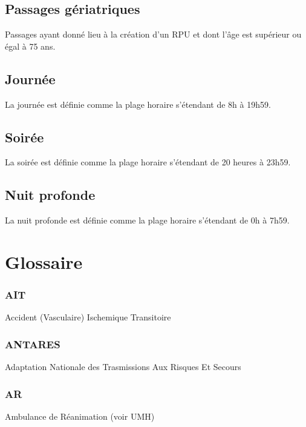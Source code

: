 \documentclass[12pt,english,french,twoside]{book}\usepackage[]{graphicx}\usepackage[]{color}
\begin{document}
\section*{Passages gériatriques}
Passages ayant donné lieu à la création d'un RPU et dont l'âge est supérieur ou égal à 75 ans.

\section*{Journée}
La journée est définie comme la plage horaire s'étendant de 8h à 19h59.

\section*{Soirée}
La soirée est définie comme la plage horaire s'étendant de 20 heures à 23h59.

\section*{Nuit profonde}
La nuit profonde est définie comme la plage horaire s'étendant de 0h à 7h59.



\newpage
\chapter{Glossaire}





\subsection*{AIT}
Accident (Vasculaire) Ischemique Transitoire

\subsection*{ANTARES}
Adaptation Nationale des Trasmissions Aux Risques Et Secours

\subsection*{AR}
Ambulance de Réanimation (voir UMH)
\end{document}
